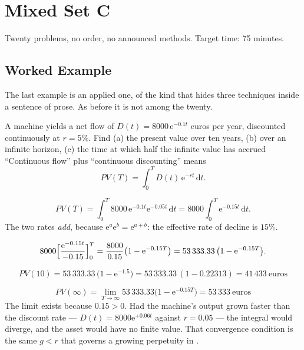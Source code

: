 \chapter{Mixed Set C}

Twenty problems, no order, no announced methods. Target time: 75 minutes.

\section{Worked Example}

The last example is an applied one, of the kind that hides three techniques
inside a sentence of prose. As before it is not among the twenty.

\begin{worked}{A machine yields a net flow of $D(t)=8000\,\mathrm{e}^{-0.1t}$ euros per year, discounted continuously at $r=5\%$. Find (a) the present value over ten years, (b) over an infinite horizon, (c) the time at which half the infinite value has accrued}
``Continuous flow'' plus ``continuous discounting'' means
\[
  PV(T)=\int_{0}^{T}D(t)\,\mathrm{e}^{-rt}\,\mathrm{d}t .
\]

\[
  PV(T)=\int_{0}^{T}8000\,\mathrm{e}^{-0.1t}\mathrm{e}^{-0.05t}\,\mathrm{d}t
  =8000\int_{0}^{T}\mathrm{e}^{-0.15t}\,\mathrm{d}t .
\]
The two rates \emph{add}, because $\mathrm{e}^{a}\mathrm{e}^{b}
=\mathrm{e}^{a+b}$: the effective rate of decline is $15\%$.

\[
  8000\Bigl[\frac{\mathrm{e}^{-0.15t}}{-0.15}\Bigr]_{0}^{T}
  =\frac{8000}{0.15}\bigl(1-\mathrm{e}^{-0.15T}\bigr)
  =53\,333.33\,\bigl(1-\mathrm{e}^{-0.15T}\bigr).
\]

\[
  PV(10)=53\,333.33\,\bigl(1-\mathrm{e}^{-1.5}\bigr)
        =53\,333.33\,(1-0.22313)
        =\boxed{41\,433\ \text{euros}}
\]

\[
  PV(\infty)=\lim_{T\to\infty}53\,333.33\bigl(1-\mathrm{e}^{-0.15T}\bigr)
  =\boxed{53\,333\ \text{euros}}
\]
The limit exists because $0.15>0$. Had the machine's output grown faster
than the discount rate --- $D(t)=8000\mathrm{e}^{+0.06t}$ against $r=0.05$
--- the integral would diverge, and the asset would have no finite value.
That convergence condition is the same $g<r$ that governs a growing
perpetuity in .


\end{worked}

